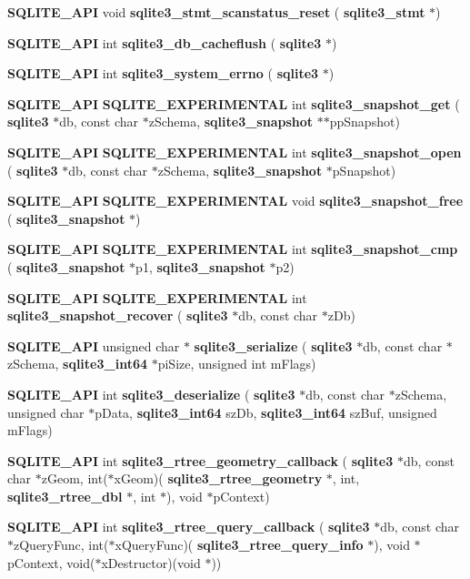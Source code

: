 \begin{DoxyCompactItemize}
\textbf{ S\+Q\+L\+I\+T\+E\+\_\+\+A\+PI} void \textbf{ sqlite3\+\_\+stmt\+\_\+scanstatus\+\_\+reset} (\textbf{ sqlite3\+\_\+stmt} $\ast$)
\item 
\textbf{ S\+Q\+L\+I\+T\+E\+\_\+\+A\+PI} int \textbf{ sqlite3\+\_\+db\+\_\+cacheflush} (\textbf{ sqlite3} $\ast$)
\item 
\textbf{ S\+Q\+L\+I\+T\+E\+\_\+\+A\+PI} int \textbf{ sqlite3\+\_\+system\+\_\+errno} (\textbf{ sqlite3} $\ast$)
\item 
\textbf{ S\+Q\+L\+I\+T\+E\+\_\+\+A\+PI} \textbf{ S\+Q\+L\+I\+T\+E\+\_\+\+E\+X\+P\+E\+R\+I\+M\+E\+N\+T\+AL} int \textbf{ sqlite3\+\_\+snapshot\+\_\+get} (\textbf{ sqlite3} $\ast$db, const char $\ast$z\+Schema, \textbf{ sqlite3\+\_\+snapshot} $\ast$$\ast$pp\+Snapshot)
\item 
\textbf{ S\+Q\+L\+I\+T\+E\+\_\+\+A\+PI} \textbf{ S\+Q\+L\+I\+T\+E\+\_\+\+E\+X\+P\+E\+R\+I\+M\+E\+N\+T\+AL} int \textbf{ sqlite3\+\_\+snapshot\+\_\+open} (\textbf{ sqlite3} $\ast$db, const char $\ast$z\+Schema, \textbf{ sqlite3\+\_\+snapshot} $\ast$p\+Snapshot)
\item 
\textbf{ S\+Q\+L\+I\+T\+E\+\_\+\+A\+PI} \textbf{ S\+Q\+L\+I\+T\+E\+\_\+\+E\+X\+P\+E\+R\+I\+M\+E\+N\+T\+AL} void \textbf{ sqlite3\+\_\+snapshot\+\_\+free} (\textbf{ sqlite3\+\_\+snapshot} $\ast$)
\item 
\textbf{ S\+Q\+L\+I\+T\+E\+\_\+\+A\+PI} \textbf{ S\+Q\+L\+I\+T\+E\+\_\+\+E\+X\+P\+E\+R\+I\+M\+E\+N\+T\+AL} int \textbf{ sqlite3\+\_\+snapshot\+\_\+cmp} (\textbf{ sqlite3\+\_\+snapshot} $\ast$p1, \textbf{ sqlite3\+\_\+snapshot} $\ast$p2)
\item 
\textbf{ S\+Q\+L\+I\+T\+E\+\_\+\+A\+PI} \textbf{ S\+Q\+L\+I\+T\+E\+\_\+\+E\+X\+P\+E\+R\+I\+M\+E\+N\+T\+AL} int \textbf{ sqlite3\+\_\+snapshot\+\_\+recover} (\textbf{ sqlite3} $\ast$db, const char $\ast$z\+Db)
\item 
\textbf{ S\+Q\+L\+I\+T\+E\+\_\+\+A\+PI} unsigned char $\ast$ \textbf{ sqlite3\+\_\+serialize} (\textbf{ sqlite3} $\ast$db, const char $\ast$z\+Schema, \textbf{ sqlite3\+\_\+int64} $\ast$pi\+Size, unsigned int m\+Flags)
\item 
\textbf{ S\+Q\+L\+I\+T\+E\+\_\+\+A\+PI} int \textbf{ sqlite3\+\_\+deserialize} (\textbf{ sqlite3} $\ast$db, const char $\ast$z\+Schema, unsigned char $\ast$p\+Data, \textbf{ sqlite3\+\_\+int64} sz\+Db, \textbf{ sqlite3\+\_\+int64} sz\+Buf, unsigned m\+Flags)
\item 
\textbf{ S\+Q\+L\+I\+T\+E\+\_\+\+A\+PI} int \textbf{ sqlite3\+\_\+rtree\+\_\+geometry\+\_\+callback} (\textbf{ sqlite3} $\ast$db, const char $\ast$z\+Geom, int($\ast$x\+Geom)(\textbf{ sqlite3\+\_\+rtree\+\_\+geometry} $\ast$, int, \textbf{ sqlite3\+\_\+rtree\+\_\+dbl} $\ast$, int $\ast$), void $\ast$p\+Context)
\item 
\textbf{ S\+Q\+L\+I\+T\+E\+\_\+\+A\+PI} int \textbf{ sqlite3\+\_\+rtree\+\_\+query\+\_\+callback} (\textbf{ sqlite3} $\ast$db, const char $\ast$z\+Query\+Func, int($\ast$x\+Query\+Func)(\textbf{ sqlite3\+\_\+rtree\+\_\+query\+\_\+info} $\ast$), void $\ast$p\+Context, void($\ast$x\+Destructor)(void $\ast$))
\end{DoxyCompactItemize}
